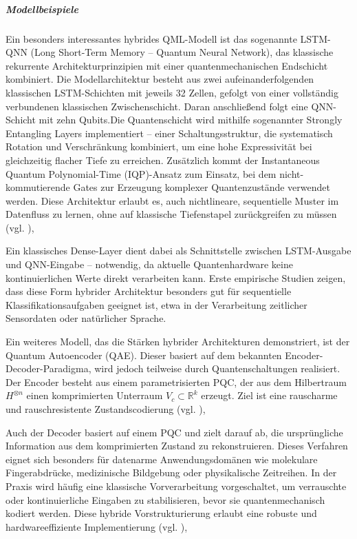 \subparagraph{Modellbeispiele}
Ein besonders interessantes hybrides QML-Modell ist das sogenannte LSTM-QNN (Long Short-Term Memory – Quantum Neural Network), das klassische rekurrente Architekturprinzipien mit einer quantenmechanischen Endschicht kombiniert. Die Modellarchitektur besteht aus zwei aufeinanderfolgenden klassischen LSTM-Schichten mit jeweils 32 Zellen, gefolgt von einer vollständig verbundenen klassischen Zwischenschicht. Daran anschließend folgt eine QNN-Schicht mit zehn Qubits.Die Quantenschicht wird mithilfe sogenannter Strongly Entangling Layers implementiert – einer Schaltungsstruktur, die systematisch Rotation und Verschränkung kombiniert, um eine hohe Expressivität bei gleichzeitig flacher Tiefe zu erreichen. Zusätzlich kommt der Instantaneous Quantum Polynomial-Time (IQP)-Ansatz zum Einsatz, bei dem nicht-kommutierende Gates zur Erzeugung komplexer Quantenzustände verwendet werden. Diese Architektur erlaubt es, auch nichtlineare, sequentielle Muster im Datenfluss zu lernen, ohne auf klassische Tiefenstapel zurückgreifen zu müssen (vgl. \cite{peral-garciaSystematicLiteratureReview2024}),

Ein klassisches Dense-Layer dient dabei als Schnittstelle zwischen LSTM-Ausgabe und QNN-Eingabe – notwendig, da aktuelle Quantenhardware keine kontinuierlichen Werte direkt verarbeiten kann. Erste empirische Studien zeigen, dass diese Form hybrider Architektur besonders gut für sequentielle Klassifikationsaufgaben geeignet ist, etwa in der Verarbeitung zeitlicher Sensordaten oder natürlicher Sprache.

Ein weiteres Modell, das die Stärken hybrider Architekturen demonstriert, ist der Quantum Autoencoder (QAE). Dieser basiert auf dem bekannten Encoder-Decoder-Paradigma, wird jedoch teilweise durch Quantenschaltungen realisiert. Der Encoder besteht aus einem parametrisierten PQC, der aus dem Hilbertraum $H^{\otimes n}$ einen komprimierten Unterraum $V_c \subset \mathbb{R}^k$ erzeugt. Ziel ist eine rauscharme und rauschresistente Zustandscodierung (vgl. \cite{peral-garciaSystematicLiteratureReview2024}),

Auch der Decoder basiert auf einem PQC und zielt darauf ab, die ursprüngliche Information aus dem komprimierten Zustand zu rekonstruieren. Dieses Verfahren eignet sich besonders für datenarme Anwendungsdomänen wie molekulare Fingerabdrücke, medizinische Bildgebung oder physikalische Zeitreihen. In der Praxis wird häufig eine klassische Vorverarbeitung vorgeschaltet, um verrauschte oder kontinuierliche Eingaben zu stabilisieren, bevor sie quantenmechanisch kodiert werden. Diese hybride Vorstrukturierung erlaubt eine robuste und hardwareeffiziente Implementierung (vgl. \cite{peral-garciaSystematicLiteratureReview2024}),

